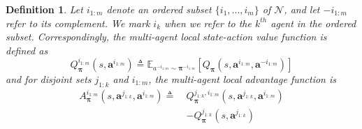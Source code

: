 \documentclass[11pt]{article}
\theoremstyle{plain}
\newtheorem{definition}{Definition}
\theoremstyle{remark}
\begin{document}
\begin{definition} {\rm \citep{kuba2022happo}}
\label{def:local_adv}
Let $i_{1:m}$ denote an ordered subset $\{i_1, ..., i_m\}$ of $\mathcal{N}$, and let $-i_{1:m}$ refer to its complement. We mark $i_k$ when we refer to the $k^{th}$ agent in the ordered subset. Correspondingly, the multi-agent local state-action value function is defined as
\begin{equation}
\label{equ:local_q}
Q_{\boldsymbol{\pi}}^{i_{1:m}}(s, \boldsymbol{a}^{i_{1:m}}) \triangleq \mathbb{E}_{a^{-i_{1:m}} \sim \boldsymbol{\pi}^{-i_{1:m}}}\left[Q_{\boldsymbol{\pi}}(s, \boldsymbol{a}^{i_{1:m}}, \boldsymbol{a}^{-i_{1:m}})\right]
\end{equation}
and for disjoint sets $j_{1:k}$ and $i_{1:m}$, the multi-agent local advantage function is
\begin{align}
\label{equ:local_adv}
A_{\boldsymbol{\pi}}^{i_{1:m}}(s, \boldsymbol{a}^{j_{1:k}}, \boldsymbol{a}^{i_{1:m}}) \triangleq \ & Q_{\boldsymbol{\pi}}^{j_{1:k},i_{1:m}}(s, \boldsymbol{a}^{j_{1:k}}, \boldsymbol{a}^{i_{1:m}}) \nonumber\\
&- Q_{\boldsymbol{\pi}}^{j_{1:k}}(s, \boldsymbol{a}^{j_{1:k}})
\end{align}
\end{definition}
\end{document}
